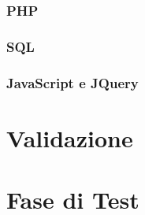 \documentclass[a4paper, oneside, openany, dvipsnames, table]{article}
\begin{document}
		\subsubsection{PHP}
		\subsubsection{SQL}
		\subsubsection{JavaScript e JQuery}
\newpage
\section{Validazione}
\newpage
\section{Fase di Test}
\end{document}
